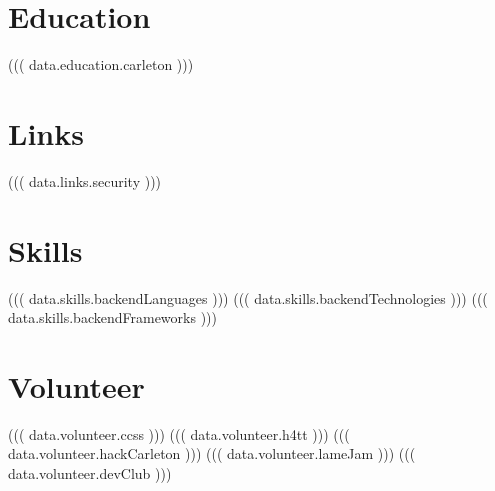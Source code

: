 \documentclass[]{deedy-resume-openfont}
\begin{document}
\vspace*{10pt}


%
%

\begin{minipage}[t]{0.33\textwidth}

\section{Education}

((( data.education.carleton )))

\section{Links}

((( data.links.security )))

\section{Skills}

((( data.skills.backendLanguages )))
((( data.skills.backendTechnologies )))
((( data.skills.backendFrameworks )))

\section{Volunteer}

((( data.volunteer.ccss )))
((( data.volunteer.h4tt )))
((( data.volunteer.hackCarleton )))
((( data.volunteer.lameJam )))
((( data.volunteer.devClub )))

%
%

\end{minipage} 
\hfill
\end{document}
